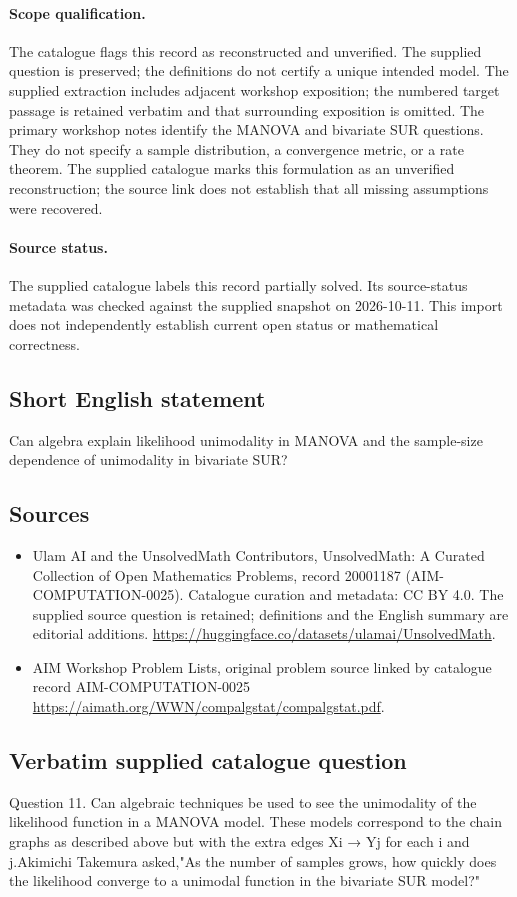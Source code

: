 \documentclass[11pt]{article}
\begin{document}
\paragraph{Scope qualification.}
The catalogue flags this record as reconstructed and unverified. The supplied question is preserved; the definitions do not certify a unique intended model. The supplied extraction includes adjacent workshop exposition; the numbered target passage is retained verbatim and that surrounding exposition is omitted. The primary workshop notes identify the MANOVA and bivariate SUR questions. They do not specify a sample distribution, a convergence metric, or a rate theorem.
The supplied catalogue marks this formulation as an unverified reconstruction; the source link does not establish that all missing assumptions were recovered.
\paragraph{Source status.}
The supplied catalogue labels this record partially solved. Its source-status metadata was checked against the supplied snapshot on 2026-10-11. This import does not independently establish current open status or mathematical correctness.
\subsection{Short English statement}
Can algebra explain likelihood unimodality in MANOVA and the sample-size dependence of unimodality in bivariate SUR?
\subsection{Sources}
\begin{itemize}
\item[S1] Ulam AI and the UnsolvedMath Contributors, UnsolvedMath: A Curated Collection of Open Mathematics Problems, record 20001187 (AIM-COMPUTATION-0025). Catalogue curation and metadata: CC BY 4.0. The supplied source question is retained; definitions and the English summary are editorial additions.
\url{https://huggingface.co/datasets/ulamai/UnsolvedMath}.
\item[S2] AIM Workshop Problem Lists, original problem source linked by catalogue record AIM-COMPUTATION-0025
\url{https://aimath.org/WWN/compalgstat/compalgstat.pdf}.
\end{itemize}
\subsection{Verbatim supplied catalogue question}
Question 11. Can algebraic techniques be used to see the unimodality of the likelihood function in a MANOVA model. These models correspond to the chain graphs as described above but with the extra edges Xi → Yj for each i and j.Akimichi Takemura asked,"As the number of samples grows, how quickly does the likelihood converge to a unimodal function in the bivariate SUR model?"
\end{document}
